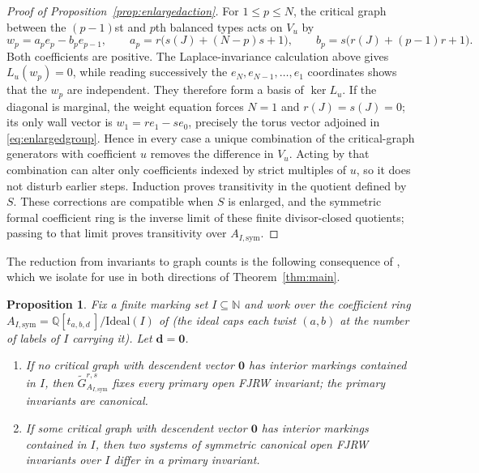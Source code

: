 \documentclass[11pt]{amsart}
\newtheorem{proposition}[theorem]{Proposition}
\theoremstyle{definition}
\theoremstyle{remark}
\newcommand{\QQ}{\mathbb{Q}}
\newcommand{\NN}{\mathbb{N}}
\begin{document}
\begin{proof}[Proof of Proposition~\ref{prop:enlargedaction}]
For $1\le p\le N$, the critical graph between the $(p-1)$st and $p$th
balanced types acts on $V_u$ by
\[
 w_p=a_pe_p-b_pe_{p-1},\qquad
 a_p=r\bigl(s(J)+(N-p)s+1\bigr),\qquad
 b_p=s\bigl(r(J)+(p-1)r+1\bigr).
\]
Both coefficients are positive.  The Laplace-invariance calculation above
gives $L_u(w_p)=0$, while reading successively the
$e_N,e_{N-1},\ldots,e_1$ coordinates shows that the $w_p$ are independent.
They therefore form a basis of $\ker L_u$.  If the diagonal is marginal, the
weight equation forces $N=1$ and $r(J)=s(J)=0$; its only wall vector is
$w_1=re_1-se_0$, precisely the torus vector adjoined in
\eqref{eq:enlargedgroup}.  Hence in every case a unique combination of the
critical-graph generators with coefficient $u$ removes the difference in
$V_u$.  Acting by that combination can alter only coefficients indexed by
strict multiples of $u$, so it does not disturb earlier steps.  Induction
proves transitivity in the quotient defined by $S$.  These corrections are
compatible when $S$ is enlarged, and the symmetric formal coefficient ring is
the inverse limit of these finite divisor-closed quotients; passing to that
limit proves transitivity over $A_{I,\mathrm{sym}}$.
\end{proof}

The reduction from invariants to graph counts is the following consequence of
\cite{GKT}, which we isolate for use in both directions of
Theorem~\ref{thm:main}.

\begin{proposition}
\label{prop:reduction}
Fix a finite marking set $I\subseteq\NN$ and work over the coefficient ring
$A_{I,\mathrm{sym}}=\QQ[t_{a,b,d}\,]/\mathrm{Ideal}(I)$ of \cite{GKT} (the
ideal caps each twist $(a,b)$ at the number of labels of $I$ carrying it). Let
$\mathbf d=\mathbf 0$.
\begin{enumerate}
\item[(a)] If no critical graph with descendent vector $\mathbf0$ has interior
markings contained in $I$, then
$\widetilde G^{r,s}_{A_{I,\mathrm{sym}}}$ fixes every primary open FJRW
invariant; the primary invariants are canonical.
\item[(b)] If some critical graph with descendent vector $\mathbf0$ has interior
markings contained in $I$, then two systems of symmetric canonical open FJRW
invariants over $I$ differ in a primary invariant.
\end{enumerate}
\end{proposition}
\end{document}

